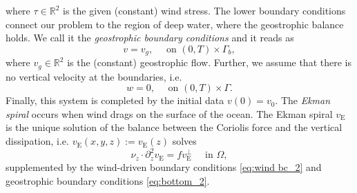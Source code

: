 \documentclass[preprint]{elsarticle}
\numberwithin{equation}{section}
\newcommand {\R}	{\mathbb{R}}
\newcommand {\T}	{\mathbb{T}}
\renewcommand{\H}{\mathrm{H}}
\newcommand{\rH}{\H}
\newcommand{\rE}{\mathrm{E}}
\begin{document}
where $\tau \in \R^2$ is the given (constant) wind stress.
The lower boundary conditions connect our problem to the region of deep water, where the geostrophic balance holds. We call it the \emph{geostrophic boundary conditions} and it reads as 
\begin{equation}
	v = v_g , \quad \text{ on } (0,T) \times \Gamma_b, %
	\label{eq:bottom_2}
\end{equation}
where $v_g \in \R^2$ is the (constant) geostrophic flow. Further, we assume that there is no vertical velocity at the boundaries, i.e.
\begin{equation}
	w = 0, \quad \text{ on } (0,T) 
	\times \Gamma . 
	\label{eq:w bc_2}
\end{equation}
Finally, this system is completed by the initial data $v(0) = v_0$. 
The %
\emph{Ekman spiral} occurs when wind drags on the surface of the ocean. The Ekman spiral
$v_{\rE}$ is the unique solution of the balance between the Coriolis force and the vertical dissipation, i.e. $v_{\rE}(x,y,z) := v_{\rE}(z)$ solves
\begin{equation}
	\nu_z \cdot \partial_z^2 v_{\rE} = f v_{\rE}^\perp \quad \text{ in } \Omega ,
	\label{eq:ekman_2}
	\tag{Ekman} 
\end{equation}
supplemented by the wind-driven boundary conditions \eqref{eq:wind bc_2} and geostrophic boundary conditions \eqref{eq:bottom_2}.


\end{document}
